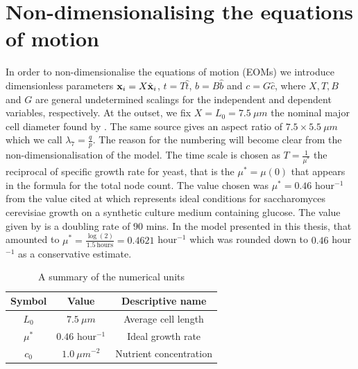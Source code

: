 \section{Non-dimensionalising the equations of motion}\label{sec:nonDimEOMs}

In order to non-dimensionalise the equations of motion (EOMs) we
introduce dimensionless parameters $\vb{x}_i = X\hat{\vb{x}}_i$, $t = T \hat{t}$, $b = B \hat{b}$
and $c = G \hat{c}$, where $X, T, B$ and $G$ are general undetermined scalings for the independent 
and dependent variables, respectively. At the outset, we fix $X = L_0 = 7.5 \ \mu m$ the nominal major cell diameter
found by \cite{chavez2024cell}. The same source gives an aspect ratio
of $7.5 \times 5.5 \ \mu m$ which we call $\lambda_7 = \frac{q}{p}$. The reason for the numbering 
will become clear from the non-dimensionalisation of the model. The time scale is chosen as
$T = \frac{1}{\mu^*}$ the reciprocal of specific growth rate for yeast, that is the $\mu^* = \mu(0)$ that appears in
the formula for the total node count. The value chosen was $\mu^* = 0.46$ hour$^{-1}$
from the value cited at \cite{salari2017investigation} which represents ideal conditions
for saccharomyces cerevisiae growth on a synthetic culture medium containing glucose. 
The value given by \cite{salari2017investigation} is a doubling rate of $90$ mins. In the model
presented in this thesis, that amounted to $\mu^* = \frac{\log(2)}{1.5 \ \textrm{hours}} = 0.4621$ hour$^{-1}$ which
was rounded down to $0.46$ hour$^{-1}$ as a conservative estimate.

\begin{table}[!htb]
\begin{center}
    \begin{tabular}{ |c|c|c| } 
     \hline
      \textbf{Symbol} & \textbf{Value} & \textbf{Descriptive name} \\ 
      \hline
     $L_0$   & $7.5 \ \mu m$       & Average cell length \\ 
     $\mu^*$ & $0.46$ hour$^{-1}$   & Ideal growth rate  \\ 
     $c_0$   & $1.0 \ \mu m^{-2}$  & Nutrient concentration \\ 
     \hline
     
    \end{tabular}
    
\end{center}
\caption{A summary of the numerical units}
\label{table:NumericalUnits}
\end{table}

